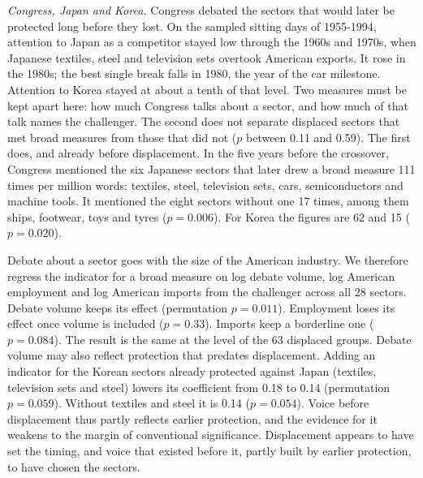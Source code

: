 \documentclass[review,authoryear,12pt]{elsarticle}
\begin{document}
\emph{Congress, Japan and Korea.} Congress debated the sectors that would later be protected long before they lost. On the sampled sitting days of 1955-1994, attention to Japan as a competitor stayed low through the 1960s and 1970s, when Japanese textiles, steel and television sets overtook American exports. It rose in the 1980s; the best single break falls in 1980, the year of the car milestone. Attention to Korea stayed at about a tenth of that level. Two measures must be kept apart here: how much Congress talks about a sector, and how much of that talk names the challenger. The second does not separate displaced sectors that met broad measures from those that did not ($p$ between 0.11 and 0.59). The first does, and already before displacement. In the five years before the crossover, Congress mentioned the six Japanese sectors that later drew a broad measure 111 times per million words: textiles, steel, television sets, cars, semiconductors and machine tools. It mentioned the eight sectors without one 17 times, among them ships, footwear, toys and tyres ($p=0.006$). For Korea the figures are 62 and 15 ($p=0.020$).

Debate about a sector goes with the size of the American industry. We therefore regress the indicator for a broad measure on log debate volume, log American employment and log American imports from the challenger across all 28 sectors. Debate volume keeps its effect (permutation $p=0.011$). Employment loses its effect once volume is included ($p=0.33$). Imports keep a borderline one ($p=0.084$). The result is the same at the level of the 63 displaced groups. Debate volume may also reflect protection that predates displacement. Adding an indicator for the Korean sectors already protected against Japan (textiles, television sets and steel) lowers its coefficient from 0.18 to 0.14 (permutation $p=0.059$). Without textiles and steel it is 0.14 ($p=0.054$). Voice before displacement thus partly reflects earlier protection, and the evidence for it weakens to the margin of conventional significance. Displacement appears to have set the timing, and voice that existed before it, partly built by earlier protection, to have chosen the sectors.
\end{document}
